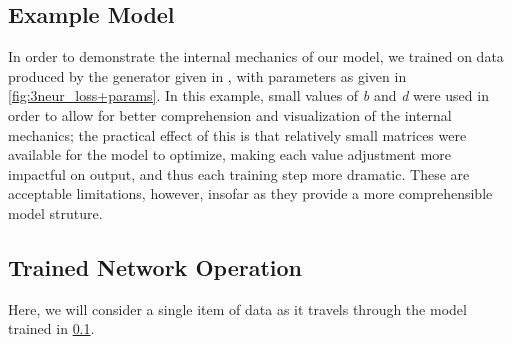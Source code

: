 \subsection{Example Model}
\label{subsec:3neurex}
In order to demonstrate the internal mechanics of our model, we trained on data 
produced by the generator given in , with 
parameters as given in \ref{fig:3neur_loss+params}. In this example, small 
values of \textit{b} and \textit{d} were used in order to allow for better 
comprehension and visualization of the internal mechanics; the practical effect 
of this is that relatively small matrices were available for the model to 
optimize, making each value adjustment more impactful on output, and thus each 
training step more dramatic.  These are acceptable limitations, however, insofar 
as they provide a more comprehensible model struture.



\subsection{Trained Network Operation}
Here, we will consider a single item of data as it travels through the model 
trained in \ref{subsec:3neurex}.


